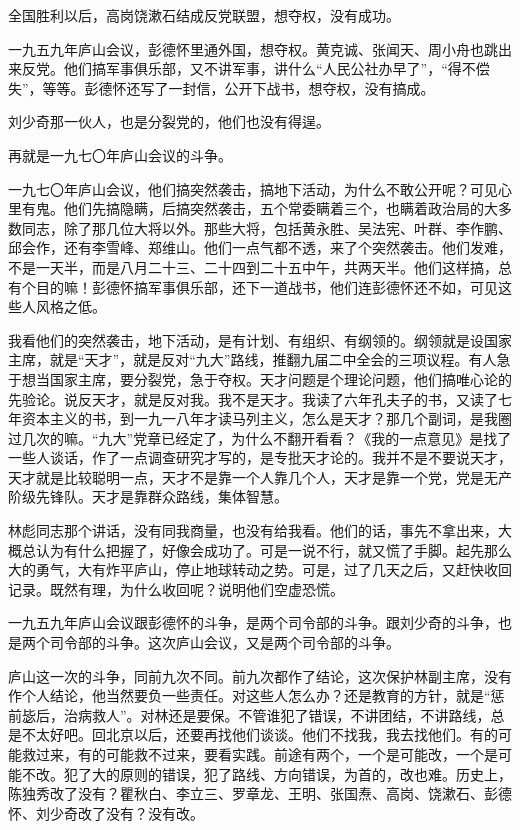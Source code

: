 全国胜利以后，高岗饶漱石结成反党联盟，想夺权，没有成功。

一九五九年庐山会议，彭德怀里通外国，想夺权。黄克诚、张闻天、周小舟也跳出来反党。他们搞军事俱乐部，又不讲军事，讲什么“人民公社办早了”，“得不偿失”，等等。彭德怀还写了一封信，公开下战书，想夺权，没有搞成。

刘少奇那一伙人，也是分裂党的，他们也没有得逞。

再就是一九七〇年庐山会议的斗争。

一九七〇年庐山会议，他们搞突然袭击，搞地下活动，为什么不敢公开呢？可见心里有鬼。他们先搞隐瞒，后搞突然袭击，五个常委瞒着三个，也瞒着政治局的大多数同志，除了那几位大将以外。那些大将，包括黄永胜、吴法宪、叶群、李作鹏、邱会作，还有李雪峰、郑维山。他们一点气都不透，来了个突然袭击。他们发难，不是一天半，而是八月二十三、二十四到二十五中午，共两天半。他们这样搞，总有个目的嘛！彭德怀搞军事俱乐部，还下一道战书，他们连彭德怀还不如，可见这些人风格之低。

我看他们的突然袭击，地下活动，是有计划、有组织、有纲领的。纲领就是设国家主席，就是“天才”，就是反对“九大”路线，推翻九届二中全会的三项议程。有人急于想当国家主席，要分裂党，急于夺权。天才问题是个理论问题，他们搞唯心论的先验论。说反天才，就是反对我。我不是天才。我读了六年孔夫子的书，又读了七年资本主义的书，到一九一八年才读马列主义，怎么是天才？那几个副词，是我圈过几次的嘛。“九大”党章已经定了，为什么不翻开看看？《我的一点意见》是找了一些人谈话，作了一点调查研究才写的，是专批天才论的。我并不是不要说天才，天才就是比较聪明一点，天才不是靠一个人靠几个人，天才是靠一个党，党是无产阶级先锋队。天才是靠群众路线，集体智慧。

林彪同志那个讲话，没有同我商量，也没有给我看。他们的话，事先不拿出来，大概总认为有什么把握了，好像会成功了。可是一说不行，就又慌了手脚。起先那么大的勇气，大有炸平庐山，停止地球转动之势。可是，过了几天之后，又赶快收回记录。既然有理，为什么收回呢？说明他们空虚恐慌。

一九五九年庐山会议跟彭德怀的斗争，是两个司令部的斗争。跟刘少奇的斗争，也是两个司令部的斗争。这次庐山会议，又是两个司令部的斗争。

庐山这一次的斗争，同前九次不同。前九次都作了结论，这次保护林副主席，没有作个人结论，他当然要负一些责任。对这些人怎么办？还是教育的方针，就是“惩前毖后，治病救人”。对林还是要保。不管谁犯了错误，不讲团结，不讲路线，总是不太好吧。回北京以后，还要再找他们谈谈。他们不找我，我去找他们。有的可能救过来，有的可能救不过来，要看实践。前途有两个，一个是可能改，一个是可能不改。犯了大的原则的错误，犯了路线、方向错误，为首的，改也难。历史上，陈独秀改了没有？瞿秋白、李立三、罗章龙、王明、张国焘、高岗、饶漱石、彭德怀、刘少奇改了没有？没有改。


